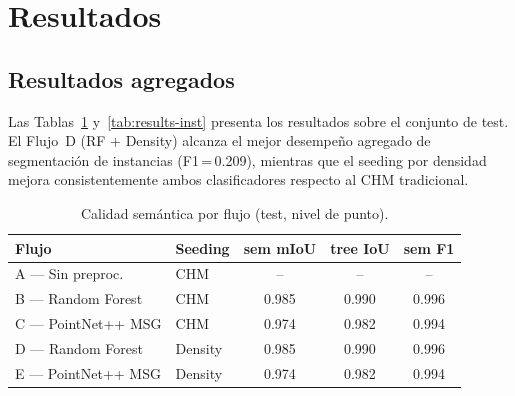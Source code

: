 \documentclass[runningheads]{llncs}
\begin{document}
\section{Resultados}\label{sec:results}

\subsection{Resultados agregados}

Las Tablas~\ref{tab:results-sem} y~\ref{tab:results-inst} presenta los resultados sobre el conjunto de test. El Flujo~D (RF + Density) alcanza el mejor desempeño agregado de segmentación de instancias (F1\,=\,0.209), mientras que el seeding por densidad mejora consistentemente ambos clasificadores respecto al CHM tradicional.

\begin{table}[H]
\centering
\caption{Calidad sem\'antica por flujo (test, nivel de punto).}\label{tab:results-sem}
\begin{tabular}{llccc}
\toprule
Flujo & Seeding & sem mIoU & tree IoU & sem F1 \\
\midrule
A --- Sin preproc.       & CHM     & --    & --    & --    \\
B --- Random Forest      & CHM     & 0.985 & 0.990 & 0.996 \\
C --- PointNet++ MSG     & CHM     & 0.974 & 0.982 & 0.994 \\
D --- Random Forest      & Density & 0.985 & 0.990 & 0.996 \\
E --- PointNet++ MSG     & Density & 0.974 & 0.982 & 0.994 \\
\bottomrule
\end{tabular}
\end{table}
\end{document}
